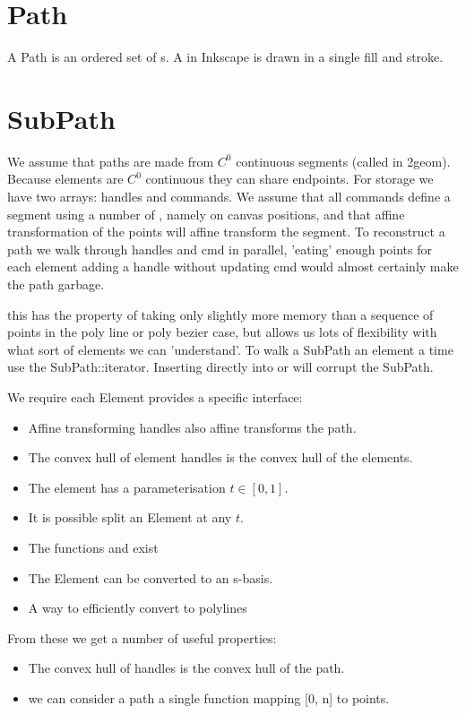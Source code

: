 \section{Path}

A Path is an ordered set of s.  A  in
Inkscape is drawn in a single fill and stroke.

\section{SubPath}


We assume that paths are made from $C^0$ continuous segments (called
 in 2geom).  Because elements are $C^0$ continuous
they can share endpoints.  For storage we have two arrays: handles and
commands.  We assume that all commands define a segment using a number
of , namely on canvas positions, and that affine
transformation of the points will affine transform the segment.  To
reconstruct a path we walk through handles and cmd in parallel,
'eating' enough points for each element adding a handle without
updating cmd would almost certainly make the path garbage.

this has the property of taking only slightly more memory than a
sequence of points in the poly line or poly bezier case, but allows us
lots of flexibility with what sort of elements we can 'understand'.
To walk a SubPath an element a time use the SubPath::iterator.
Inserting directly into  or 
will corrupt the SubPath.

We require each Element provides a specific interface:

\begin{itemize}
\item Affine transforming handles also affine transforms the path.
\item The convex hull of element handles is the convex hull of the elements.
\item The element has a parameterisation $t \in [0,1]$.
\item It is possible split an Element at any $t$.
\item The functions  and  exist
\item The Element can be converted to an s-basis.
\item A way to efficiently convert to polylines
\end{itemize}

From these we get a number of useful properties:
\begin{itemize}
\item The convex hull of handles is the convex hull of the path.
\item we can consider a path a single function mapping [0, n] to points.
\end{itemize}

